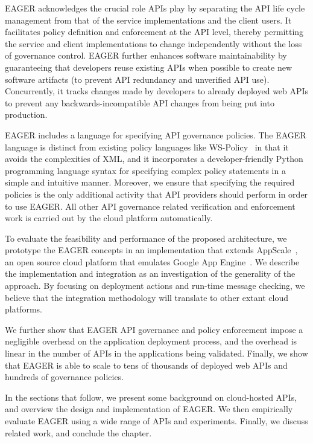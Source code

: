 EAGER acknowledges the crucial role APIs play
 by separating the API life cycle management from that
of the service implementations and the client users.  
It facilitates policy definition and enforcement at
the API level, thereby permitting the service and client implementations to change
independently without the loss of governance control.
EAGER further enhances software maintainability by guaranteeing that 
developers reuse existing APIs when possible to create new software artifacts
(to prevent API redundancy and unverified API use). Concurrently, it
tracks changes made by developers to already deployed web APIs to prevent
any backwards-incompatible API changes from being put into production.

EAGER includes a language for specifying 
API governance policies.  The EAGER language is distinct from 
existing policy languages like WS-Policy~\cite{WSPolicy,soagovstandard}
in that it avoids the complexities of XML, 
and it incorporates a developer-friendly Python programming language syntax for 
specifying complex policy statements in a simple and 
intuitive manner. Moreover, we ensure that specifying the required policies 
is the only additional activity that API providers should perform in
order to use EAGER. All other API governance related verification and 
enforcement work is carried out by the cloud platform automatically.

To evaluate the feasibility and performance of the proposed 
architecture, we prototype the EAGER concepts in an implementation
that extends AppScale~\cite{appscale13}, 
an open source
cloud platform that emulates Google App Engine~\cite{gae}. We describe
the implementation and integration as an investigation of
the generality of the approach.  By focusing on deployment actions and
run-time message checking, we believe that the integration methodology
will translate to other extant cloud platforms.


We further show that 
EAGER API governance and policy enforcement impose a negligible 
overhead on the application deployment process, and the overhead
is linear in the number of APIs in the applications 
being validated.  
Finally, we show that EAGER is able to
scale to tens of thousands of deployed web APIs and hundreds of
governance policies.

In the sections that follow, we present some background on cloud-hosted APIs,
and overview the design and implementation of
EAGER. We then empirically evaluate EAGER using a wide range of APIs and
experiments.  Finally, we discuss related work, and conclude the chapter.